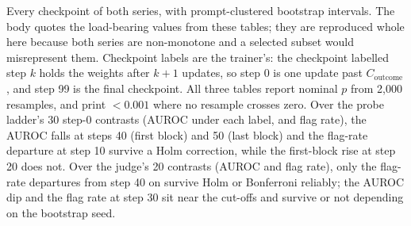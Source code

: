 \documentclass{article}
\begin{document}
Every checkpoint of both series, with prompt-clustered bootstrap intervals. The body quotes the load-bearing values from these tables; they are reproduced whole here because both series are non-monotone and a selected subset would misrepresent them. Checkpoint labels are the trainer's: the checkpoint labelled step $k$ holds the weights after $k+1$ updates, so step 0 is one update past $C_{\text{outcome}}$, and step 99 is the final checkpoint. All three tables report nominal $p$ from 2{,}000 resamples, and print $<0.001$ where no resample crosses zero. Over the probe ladder's 30 step-0 contrasts (AUROC under each label, and flag rate), the AUROC falls at steps 40 (first block) and 50 (last block) and the flag-rate departure at step 10 survive a Holm correction, while the first-block rise at step 20 does not. Over the judge's 20 contrasts (AUROC and flag rate), only the flag-rate departures from step 40 on survive Holm or Bonferroni reliably; the AUROC dip and the flag rate at step 30 sit near the cut-offs and survive or not depending on the bootstrap seed.
\end{document}
